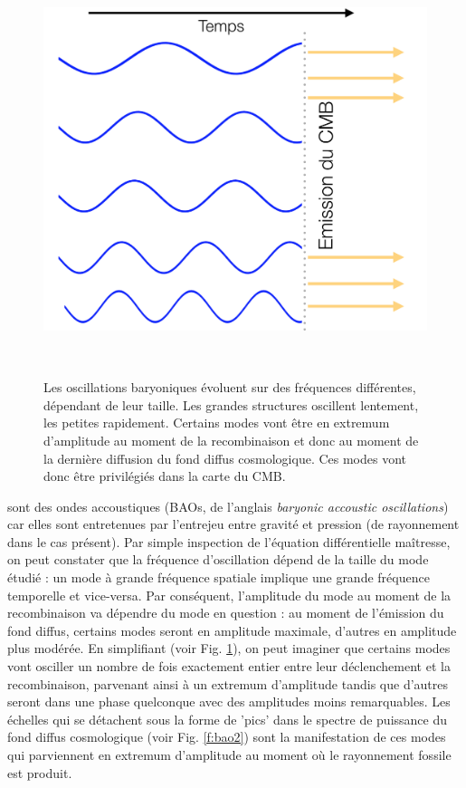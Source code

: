 \begin{figure}[htbp]
	\centering
		\includegraphics[height=12cm]{figs/bao1.png}
	\caption[Les oscillations baryoniques évoluent sur des fréquences différentes, dépendant de leur taille.]{Les oscillations baryoniques évoluent sur des fréquences différentes, dépendant de leur taille. Les grandes structures oscillent lentement, les petites rapidement. Certains modes vont être en extremum d'amplitude au moment de la recombinaison et donc au moment de la dernière diffusion du fond diffus cosmologique. Ces modes vont donc être privilégiés dans la carte du CMB.}
	\label{f:bao1}
\end{figure}


  sont des ondes accoustiques (BAOs, de l'anglais \textit{baryonic accoustic oscillations}) car elles sont entretenues par l'entrejeu entre gravité et pression (de rayonnement dans le cas présent). Par simple inspection de l'équation différentielle maîtresse, on peut constater que la fréquence d'oscillation dépend de la taille du mode étudié : un mode à grande fréquence spatiale implique une grande fréquence temporelle et vice-versa. Par conséquent, l'amplitude du mode au moment de la recombinaison va dépendre du mode en question : au moment de l'émission du fond diffus, certains modes seront en amplitude maximale, d'autres en amplitude plus modérée. En simplifiant (voir Fig. \ref{f:bao1}), on peut imaginer que certains modes vont osciller un nombre de fois exactement entier entre leur déclenchement et la recombinaison, parvenant ainsi à un extremum d'amplitude tandis que d'autres seront dans une phase quelconque avec des amplitudes moins remarquables. Les échelles qui se détachent sous la forme de 'pics' dans le spectre de puissance du fond diffus cosmologique (voir Fig. \ref{f:bao2}) sont la manifestation de ces modes qui parviennent en extremum d'amplitude au moment où le rayonnement fossile est produit.



